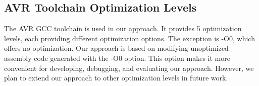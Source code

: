 \subsection{AVR Toolchain Optimization Levels}
\vspace{-10pt}
The AVR GCC toolchain is used in our approach. It provides 5 optimization levels, each providing different optimization options. The exception is -O0, which offers no optimization\cite{hoste2008cole}. Our approach is based on modifying unoptimized assembly code generated with the -O0 option. This option makes it more convenient for developing, debugging, and evaluating our approach. However, we plan to extend our approach to other optimization levels in future work.

